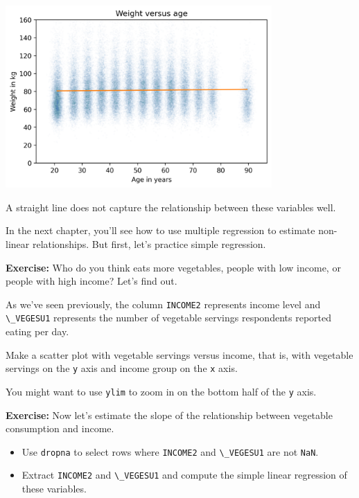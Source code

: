 \begin{center}
\includegraphics[width=4in]{chapters/09_relationships_files/09_relationships_106_0.png}
\end{center}

A straight line does not capture the relationship between these
variables well.

In the next chapter, you'll see how to use multiple regression to
estimate non-linear relationships. But first, let's practice simple
regression.

\textbf{Exercise:} Who do you think eats more vegetables, people with
low income, or people with high income? Let's find out.

As we've seen previously, the column \passthrough{\lstinline!INCOME2!}
represents income level and \passthrough{\lstinline!\_VEGESU1!}
represents the number of vegetable servings respondents reported eating
per day.

Make a scatter plot with vegetable servings versus income, that is, with
vegetable servings on the \passthrough{\lstinline!y!} axis and income
group on the \passthrough{\lstinline!x!} axis.

You might want to use \passthrough{\lstinline!ylim!} to zoom in on the
bottom half of the \passthrough{\lstinline!y!} axis.

\textbf{Exercise:} Now let's estimate the slope of the relationship
between vegetable consumption and income.

\begin{itemize}
\item
  Use \passthrough{\lstinline!dropna!} to select rows where
  \passthrough{\lstinline!INCOME2!} and
  \passthrough{\lstinline!\_VEGESU1!} are not
  \passthrough{\lstinline!NaN!}.
\item
  Extract \passthrough{\lstinline!INCOME2!} and
  \passthrough{\lstinline!\_VEGESU1!} and compute the simple linear
  regression of these variables.
\end{itemize}


